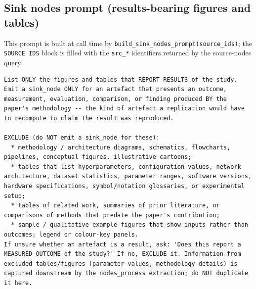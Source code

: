 \documentclass{article}
\begin{document}
\subsection{Sink nodes prompt (results-bearing figures and tables)}
\label{app:prompts:sink-nodes}

This prompt is built at call time by \texttt{build\_sink\_nodes\_prompt(source\_ids)};
the \texttt{SOURCE IDS} block is filled with the \texttt{src\_*} identifiers
returned by the source-nodes query.

\begin{lstlisting}
List ONLY the figures and tables that REPORT RESULTS of the study. Emit a sink_node ONLY for an artefact that presents an outcome, measurement, evaluation, comparison, or finding produced BY the paper's methodology -- the kind of artefact a replication would have to recompute to claim the result was reproduced.

EXCLUDE (do NOT emit a sink_node for these):
  * methodology / architecture diagrams, schematics, flowcharts, pipelines, conceptual figures, illustrative cartoons;
  * tables that list hyperparameters, configuration values, network architecture, dataset statistics, parameter ranges, software versions, hardware specifications, symbol/notation glossaries, or experimental setup;
  * tables of related work, summaries of prior literature, or comparisons of methods that predate the paper's contribution;
  * sample / qualitative example figures that show inputs rather than outcomes; legend or colour-key panels.
If unsure whether an artefact is a result, ask: 'Does this report a MEASURED OUTCOME of the study?' If no, EXCLUDE it. Information from excluded tables/figures (parameter values, methodology details) is captured downstream by the nodes_process extraction; do NOT duplicate it here.


\end{lstlisting}
\end{document}
